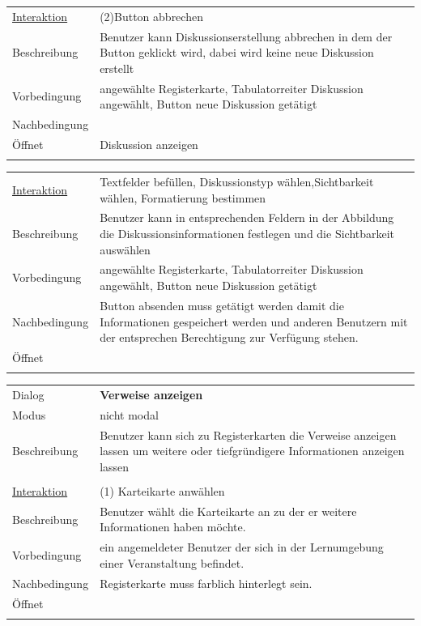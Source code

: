 \documentclass[12pt,a4paper]{article}
\begin{document}
{\begin{tabular}{l p{12cm}}
\underline{Interaktion} & (2)Button abbrechen   \\ 
Beschreibung   	 		& Benutzer kann Diskussionserstellung abbrechen in dem der Button geklickt wird, dabei wird keine neue Diskussion erstellt\\
Vorbedingung	 		&angewählte Registerkarte,  Tabulatorreiter Diskussion angewählt, Button neue Diskussion getätigt\\
Nachbedingung	 		& \\
Öffnet			 		& \glqq Diskussion anzeigen\grqq \\\\
\end{tabular}

\begin{tabular}{l p{12cm}}
\underline{Interaktion} & Textfelder befüllen, Diskussionstyp wählen,Sichtbarkeit wählen, Formatierung bestimmen\\ 
Beschreibung   	 		& Benutzer kann in entsprechenden Feldern in der Abbildung die Diskussionsinformationen festlegen und die Sichtbarkeit auswählen  \\
Vorbedingung	 		&angewählte Registerkarte,  Tabulatorreiter Diskussion angewählt, Button neue Diskussion getätigt\\
Nachbedingung	 		& Button absenden muss getätigt werden damit die Informationen gespeichert werden und anderen Benutzern mit der entsprechen Berechtigung zur Verfügung stehen.\\
Öffnet			 		& \\\\
\end{tabular}





\begin{tabular}{l p{12cm}}
Dialog 	 		 & \textbf{Verweise anzeigen} \\ 
Modus 			 & nicht modal\\ 
Beschreibung   	 & Benutzer kann sich zu Registerkarten die Verweise anzeigen lassen um weitere oder tiefgründigere Informationen anzeigen lassen\\\\

\underline{Interaktion} & (1) Karteikarte anwählen\\ 
Beschreibung   	 		& Benutzer wählt die Karteikarte an zu der er weitere Informationen haben möchte. \\
Vorbedingung	 		& ein angemeldeter Benutzer der sich in der Lernumgebung einer Veranstaltung befindet.\\
Nachbedingung	 		& Registerkarte muss farblich hinterlegt sein.\\
Öffnet			 		&  \\\\
\end{tabular}

}
\end{document}
